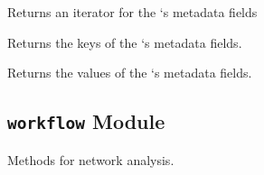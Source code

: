 \documentclass[letterpaper,10pt,english]{sphinxmanual}
\begin{document}
\begin{fulllineitems}
\begin{fulllineitems}
\end{fulllineitems}


\begin{fulllineitems}
\label{tethne:tethne.data.Paper.iteritems}
Returns an iterator for the {\hyperref[tethne:tethne.data.Paper]{}}`s metadata fields

\end{fulllineitems}


\begin{fulllineitems}
\label{tethne:tethne.data.Paper.keys}
Returns the keys of the {\hyperref[tethne:tethne.data.Paper]{}}`s metadata fields.

\end{fulllineitems}


\begin{fulllineitems}
\label{tethne:tethne.data.Paper.values}
Returns the values of the {\hyperref[tethne:tethne.data.Paper]{}}`s metadata fields.

\end{fulllineitems}


\end{fulllineitems}



\subsection{\texttt{workflow} Module}
\label{tethne:module-tethne.workflow}\label{tethne:workflow-module}
Methods for network analysis.
\end{document}

